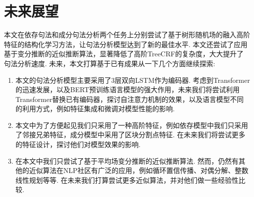 \section{未来展望}
本文在依存句法和成分句法分析两个任务上分别尝试了基于树形随机场的融入高阶特征的结构化学习方法，让句法分析模型达到了新的最佳水平.
本文还尝试了应用基于变分推断的近似推断算法，显著降低了高阶TreeCRF的复杂度，大大提升了句法分析速度.
未来，本文打算基于已有成果从一下几个方面继续探索:
\begin{enumerate}
	\item 本文的句法分析模型主要采用了3层双向LSTM作为编码器.
	      考虑到Transformer的迅速发展，以及BERT预训练语言模型的强大作用，未来我们将尝试利用Transformer替换已有编码器，探讨自注意力机制的效果，以及语言模型不同的利用方式，例如特征集成和微调对模型性能的影响.
	\item 本文中为了方便起见我们只采用了一种高阶特征，例如依存模型中我们只采用了邻接兄弟特征，成分模型中采用了区块分割点特征.
	      在未来我们将尝试更多的特征设计，探讨他们对模型效果的影响.
	\item 在本文中我们只尝试了基于平均场变分推断的近似推断算法.
	      然而，仍然有其他的近似算法在NLP社区有广泛的应用，例如循环置信传播、对偶分解、整数线性规划等等.
	      在未来我们打算尝试更多近似算法，并对他们做一些经验性比较.
\end{enumerate}